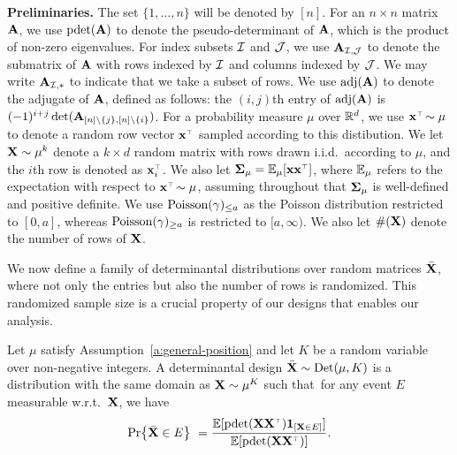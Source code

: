 \documentclass[11pt]{article}
\begin{document}
\textbf{Preliminaries.}
The set $\{1,...,n\}$ will be denoted by $[n]$.
For an $n\times n$ matrix $\mathbf A$, we use $\mathrm{pdet}(\mathbf A)$ to denote the pseudo-determinant of $\mathbf A$,
which is the product of non-zero eigenvalues. For index subsets $\mathcal I$
and $\mathcal{J}$, we use $\mathbf A_{\mathcal I,\mathcal{J}}$ to denote the submatrix of $\mathbf A$ with
rows indexed by $\mathcal I$ and columns indexed by $\mathcal{J}$. We may write
$\mathbf A_{\mathcal I,*}$ to indicate that we take a subset of rows. We use $\operatorname{\textnormal{adj}}(\mathbf A)$ to
denote the adjugate of $\mathbf A$, defined as follows: the
$(i,j)$th entry of $\operatorname{\textnormal{adj}}(\mathbf A)$ is
$(-1)^{i+j}\det(\mathbf A_{[n]\backslash\{j\},[n]\backslash\{i\}})$.
For a probability measure $\mu$ over $\mathbb R^d$, we use $\x^\top\!\sim\mu$
to denote a random row vector $\x^\top$ sampled according to this distibution.
We let $\mathbf X\sim\mu^k$ denote a $k\times d$ random matrix with rows
drawn i.i.d.~according to $\mu$, and the $i$th row is denoted as $\x_i^\top$.
We also let $\Sigmab_\mu=\E_{\mu}[\x\x^\top]$, where $\mathbb E_{\mu}$ refers to
the expectation with respect to $\x^\top\!\sim\mu$, assuming throughout that
$\mathbf{\Sigma}_\mu$ is well-defined and positive definite.
We use ${\operatorname{Poisson}}(\gamma)_{\leq a}$ as the Poisson distribution
restricted to $[0,a]$, whereas ${\operatorname{Poisson}}(\gamma)_{\geq a}$ is restricted
to $[a,\infty)$.
We also let $\#(\mathbf X)$ denote the number of rows of $\mathbf X$.

We now define a family of determinantal distributions over random matrices ${\bar{\mathbf X}}$,
where not only the entries but also the number of rows is
randomized.
This randomized sample size is a crucial property of our
designs that enables our analysis.
\begin{definition}\label{d:det}
  Let $\mu$ satisfy Assumption~\ref{a:general-position} and let $K$ be
  a random variable over non-negative integers. A determinantal design
    ${\bar{\mathbf X}}\sim {\mathrm{Det}}(\mu,K)$ is a
distribution with the same domain as $\mathbf X\sim\mu^K$ such that~for any
event $E$ measurable w.r.t.~$\mathbf X$, we have
\begin{align*}
\Pr\big\{\Xb\in E\big\}\ = \frac{\E[\pdet(\X\X^\top)\one_{[\X\in E]}]}{\E[\pdet(\X\X^\top)]}.
\end{align*}
\end{definition}
\end{document}
